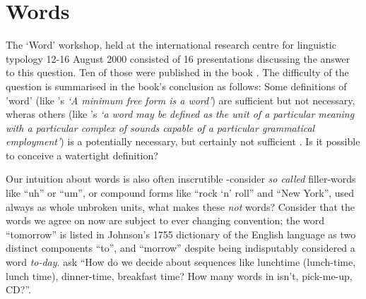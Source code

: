 \chapter{Words}\label{chap:preliminaries}
\noindent
The `Word' workshop, held at the international research centre for linguistic typology 12-16 August 2000 consisted of 16 presentations discussing the answer to this question. Ten of those were published in the book . The difficulty of the question is summarised in the book's conclusion as follows:
\noindent
Some definitions of 'word' (like \citeauthor{bloomfield-1926-a-set-of}'s \parencite*{bloomfield-1926-a-set-of} \emph{`A minimum free form is a word'}) are sufficient but not necessary, wheras others (like \citeauthor{lyons-1968-introduction}'s \parencite*{lyons-1968-introduction} \emph{`a word may be defined as the unit of a particular meaning with a particular complex of sounds capable of a particular grammatical employment'}) is a potentially necessary, but certainly not sufficient \parencite{dixon02-word}. Is it possible to conceive a watertight definition?

Our intuition about words is also often inscrutible -consider \emph{so called} filler-words like ``uh'' or ``um'', or compound forms like ``rock `n' roll'' and ``New York'', used always as whole unbroken units, what makes these \emph{not} words? Consider that the words we agree on now are subject to ever changing convention; the word ``tomorrow'' is listed in Johnson's 1755 dictionary of the English language as two distinct components ``to'', and ``morrow'' despite being indisputably considered a word \emph{to-day}. \textcite{halliday-2004-lexicology} ask ``How do we decide about sequences like lunchtime (lunch-time, lunch time), dinner-time, breakfast time? How many words in isn't, pick-me-up, CD?''.

